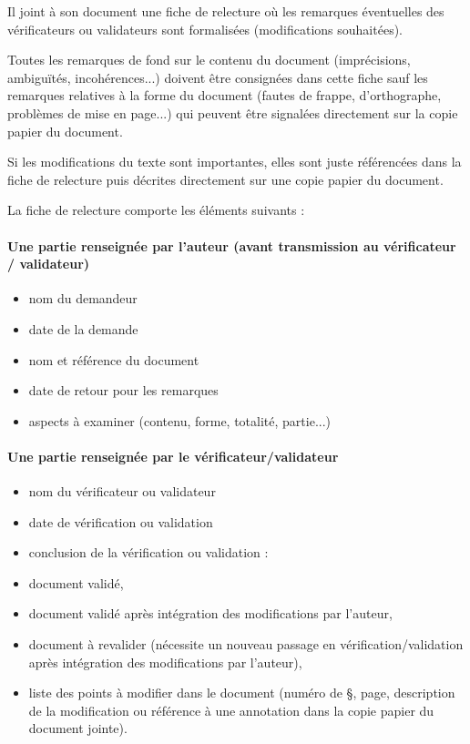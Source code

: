 \documentclass[a4paper]{article}
\begin{document}
Il joint à son document une fiche de relecture où les remarques éventuelles des vérificateurs ou validateurs sont formalisées (modifications souhaitées).

Toutes les remarques de fond sur le contenu du document (imprécisions, ambiguïtés, incohérences...) doivent être consignées dans cette fiche sauf les remarques relatives à la forme du document (fautes de frappe, d'orthographe, problèmes de mise en page...) qui peuvent être signalées directement sur la copie papier du document.

Si les modifications du texte sont importantes, elles sont juste référencées dans la fiche de relecture puis décrites directement sur une copie papier du document.

La fiche de relecture comporte les éléments suivants : 

\paragraph{Une partie renseignée par l'auteur (avant transmission au vérificateur / validateur)}

\begin{itemize}
\item nom du demandeur
\item date de la demande
\item nom et référence du document
\item date de retour pour les remarques
\item aspects à examiner (contenu, forme, totalité, partie...)
\end{itemize}

\paragraph{Une partie renseignée par le vérificateur/validateur}

\begin{itemize}
\item nom du vérificateur ou validateur
\item date de vérification ou validation
\item conclusion de la vérification ou validation :
\item document validé,
\item document validé après intégration des modifications par l'auteur,
\item document à revalider (nécessite un nouveau passage en vérification/validation après intégration des modifications par l'auteur),
\item liste des points à modifier dans le document (numéro de §, page, description de la modification ou référence à une annotation dans la copie papier du document jointe).
\end{itemize}
\end{document}
